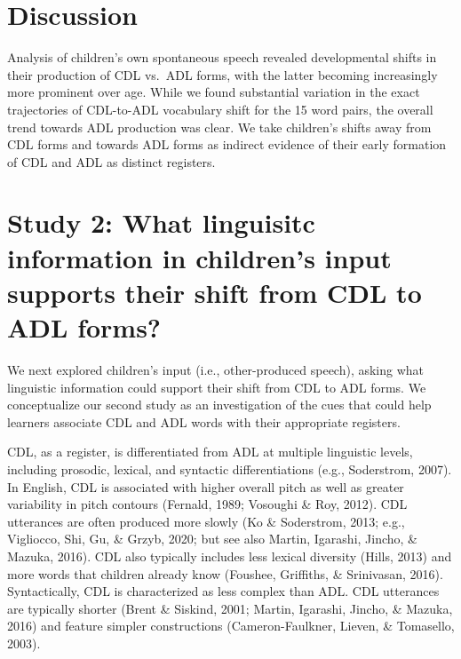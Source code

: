 \documentclass[10pt, letterpaper]{article}
\begin{document}
\hypertarget{discussion}{%
\section{Discussion}\label{discussion}}

Analysis of children's own spontaneous speech revealed developmental
shifts in their production of CDL vs.~ADL forms, with the latter
becoming increasingly more prominent over age. While we found
substantial variation in the exact trajectories of CDL-to-ADL vocabulary
shift for the 15 word pairs, the overall trend towards ADL production
was clear. We take children's shifts away from CDL forms and towards ADL
forms as indirect evidence of their early formation of CDL and ADL as
distinct registers.

\hypertarget{study-2-what-linguisitc-information-in-childrens-input-supports-their-shift-from-cdl-to-adl-forms}{%
\section{Study 2: What linguisitc information in children's input
supports their shift from CDL to ADL
forms?}\label{study-2-what-linguisitc-information-in-childrens-input-supports-their-shift-from-cdl-to-adl-forms}}

We next explored children's input (i.e., other-produced speech), asking
what linguistic information could support their shift from CDL to ADL
forms. We conceptualize our second study as an investigation of the cues
that could help learners associate CDL and ADL words with their
appropriate registers.

CDL, as a register, is differentiated from ADL at multiple linguistic
levels, including prosodic, lexical, and syntactic differentiations
(e.g., Soderstrom, 2007). In English, CDL is associated with higher
overall pitch as well as greater variability in pitch contours (Fernald,
1989; Vosoughi \& Roy, 2012). CDL utterances are often produced more
slowly (Ko \& Soderstrom, 2013; e.g., Vigliocco, Shi, Gu, \& Grzyb,
2020; but see also Martin, Igarashi, Jincho, \& Mazuka, 2016). CDL also
typically includes less lexical diversity (Hills, 2013) and more words
that children already know (Foushee, Griffiths, \& Srinivasan, 2016).
Syntactically, CDL is characterized as less complex than ADL. CDL
utterances are typically shorter (Brent \& Siskind, 2001; Martin,
Igarashi, Jincho, \& Mazuka, 2016) and feature simpler constructions
(Cameron-Faulkner, Lieven, \& Tomasello, 2003).
\end{document}
